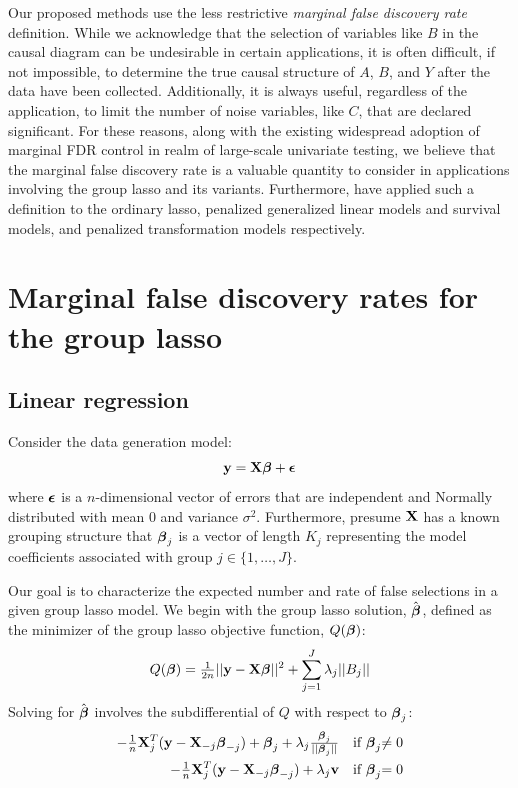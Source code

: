 Our proposed methods use the less restrictive \textit{marginal false discovery rate} definition. While we acknowledge that the selection of variables like $B$ in the causal diagram can be undesirable in certain applications, it is often difficult, if not impossible, to determine the true causal structure of $A$, $B$, and $Y$ after the data have been collected. Additionally, it is always useful, regardless of the application, to limit the number of noise variables, like $C$, that are declared significant. For these reasons, along with the existing widespread adoption of marginal FDR control in realm of large-scale univariate testing, we believe that the marginal false discovery rate is a valuable quantity to consider in applications involving the group lasso and its variants. Furthermore, \citet{Breheny2019, Miller2019, Liang2021} have applied such a definition to the ordinary lasso, penalized generalized linear models and survival models, and penalized transformation models respectively.

\section{Marginal false discovery rates for the group lasso}
\label{Sec:main_meth}

\subsection{Linear regression}

Consider the data generation model:
\begin{equation}
\mathbf{y} = \mathbf{X}\boldsymbol{\beta} + \boldsymbol{\epsilon}
\end{equation}
where $\boldsymbol{\epsilon}$ is a $n$-dimensional vector of errors that are independent and Normally distributed with mean 0 and variance $\sigma^2$. Furthermore, presume $\mathbf{X}$ has a known grouping structure that $\boldsymbol{\beta}_j$ is a vector of length $K_j$ representing the model coefficients associated with group $j \in \{1, \ldots, J\}$. 

Our goal is to characterize the expected number and rate of false selections in a given group lasso model. We begin with the group lasso solution, $\hat{\boldsymbol{\beta}}$, defined as the minimizer of the group lasso objective function, $Q(\boldsymbol{\beta})$:
\begin{equation}
Q(\boldsymbol{\beta}) = \tfrac{1}{2n}||\mathbf{y} - \mathbf{X}\boldsymbol{\beta}||^2 + \sum_{j = 1}^{J}\lambda_j ||B_j||
\end{equation}
Solving for $\hat{\boldsymbol{\beta}}$ involves the subdifferential of $Q$ with respect to $\boldsymbol{\beta}_j$:
\begin{equation}
\label{eq:kkt}
\begin{alignedat}{2}
-\tfrac{1}{n}\mathbf{X}_j^T(\mathbf{y} - \mathbf{X}_{-j}\boldsymbol{\beta}_{-j}) + \boldsymbol{\beta}_j + \lambda_j\tfrac{\boldsymbol{\beta}_j}{||\boldsymbol{\beta}_j||} &\quad \text{if } \boldsymbol{\beta}_j &\neq 0 \\
-\tfrac{1}{n}\mathbf{X}_j^T(\mathbf{y} - \mathbf{X}_{-j}\boldsymbol{\beta}_{-j}) + \lambda_j\mathbf{v} &\quad \text{if } \boldsymbol{\beta}_j &= 0
\end{alignedat}
\end{equation}


